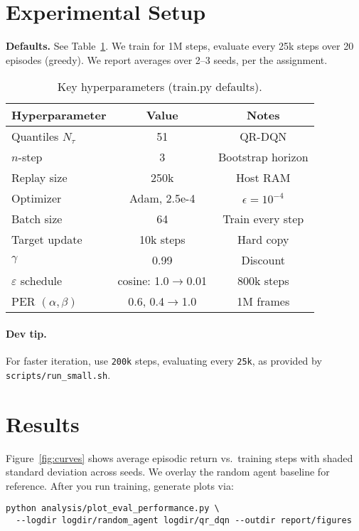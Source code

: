 \documentclass[11pt]{article}
\begin{document}
\section{Experimental Setup}
\textbf{Defaults.} See Table~\ref{tab:hparams}. We train for 1M steps, evaluate every 25k steps over 20 episodes (greedy). We report averages over 2--3 seeds, per the assignment.

\begin{table}[h]
\centering
\begin{tabular}{lcc}
\toprule
Hyperparameter & Value & Notes \\
\midrule
Quantiles $N_\tau$ & 51 & QR-DQN \\
$n$-step & 3 & Bootstrap horizon \\
Replay size & 250k & Host RAM \\
Optimizer & Adam, 2.5e-4 & $\epsilon=10^{-4}$ \\
Batch size & 64 & Train every step \\
Target update & 10k steps & Hard copy \\
$\gamma$ & 0.99 & Discount \\
$\varepsilon$ schedule & cosine: 1.0$\to$0.01 & 800k steps \\
PER $(\alpha,\beta)$ & 0.6, 0.4$\to$1.0 & 1M frames \\
\bottomrule
\end{tabular}
\caption{Key hyperparameters (train.py defaults).}
\label{tab:hparams}
\end{table}

\paragraph{Dev tip.} For faster iteration, use \texttt{200k} steps, evaluating every \texttt{25k}, as provided by \texttt{scripts/run\_small.sh}.

\section{Results}
Figure~\ref{fig:curves} shows average episodic return vs.\ training steps with shaded standard deviation across seeds. We overlay the random agent baseline for reference. After you run training, generate plots via:
\begin{verbatim}
python analysis/plot_eval_performance.py \
  --logdir logdir/random_agent logdir/qr_dqn --outdir report/figures
\end{verbatim}
\end{document}
